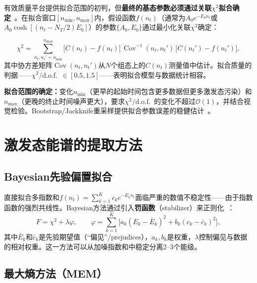 \documentclass[12pt,a4paper]{ctexart}
\theoremstyle{definition}
\begin{document}
有效质量平台提供拟合范围的初判，但\textbf{最终的基态参数必须通过关联$\chi^2$拟合确定}~\cite{GattringerLang2010}。在拟合窗口$[n_{\min}, n_{\max}]$内，假设函数$f(n_t)$（通常为$A_0 e^{-E_0 n_t}$或$A_0\cosh[(n_t - N_T/2)E_0]$）的参数$\{A_0, E_0\}$通过最小化关联$\chi^2$确定：

\begin{equation}
\boxed{\chi^2 = \sum_{n_t, n_t' = n_{\min}}^{n_{\max}} \big[C(n_t) - f(n_t)\big]\,\operatorname{Cov}^{-1}(n_t, n_t')\,\big[C(n_t') - f(n_t')\big]},
\label{eq:correlated_chisq}
\end{equation}
其中协方差矩阵$\operatorname{Cov}(n_t, n_t')$从$N$个组态上的$C(n_t)$测量值中估计。拟合质量的判据——$\chi^2/$d.o.f.\ $\in [0.5, 1.5]$——表明拟合模型与数据统计相容。

\textbf{拟合范围的确定：}变化$n_{\min}$（更早的起始时间包含更多数据但更多激发态污染）和$n_{\max}$（更晚的终止时间噪声更大），要求$\chi^2/$d.o.f.\ 的变化不超过$\mathcal{O}(1)$，并结合视觉检验。Bootstrap/Jackknife重采样提供拟合参数误差的稳健估计~\cite{GattringerLang2010}。

\section{激发态能谱的提取方法}

\subsection{Bayesian先验偏置拟合}

直接拟合多指数和$f(n_t) = \sum_{k=1}^K c_k e^{-E_k n_t}$面临严重的数值不稳定性——由于指数函数的强烈共线性。Bayesian方法通过引入\textbf{罚函数}（stabilizer）来正则化~\cite{GattringerLang2010}：
\begin{equation}
F = \chi^2 + \lambda \varphi, \qquad \varphi = \sum_{k=1}^K \big[a_k (E_k - \bar E_k)^2 + b_k (c_k - \bar c_k)^2\big],
\label{eq:bayesian_stabilizer}
\end{equation}
其中$\bar E_k$和$\bar c_k$是先验期望值（``偏见''/prejudices），$a_k, b_k$是权重，$\lambda$控制偏见与数据的相对权重。这一方法可以从加噪指数和中稳定分离2--3个能级。

\subsection{最大熵方法（MEM）}
\end{document}

